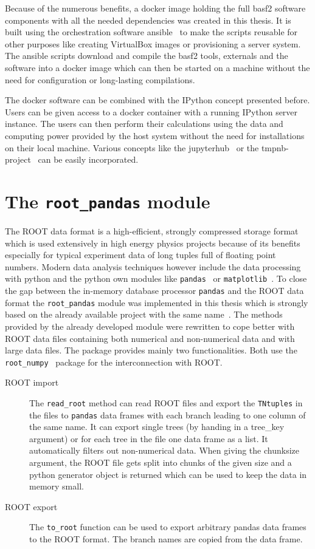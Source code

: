 Because of the numerous benefits, a docker image holding the full basf2 software components with all the needed dependencies was created in this thesis. It is built using the orchestration software ansible~\cite{ansible} to make the scripts reusable for other purposes like creating VirtualBox images or provisioning a server system. The ansible scripts download and compile the basf2 tools, externals and the software into a docker image which can then be started on a machine without the need for configuration or long-lasting compilations.

The docker software can be combined with the IPython concept presented before. Users can be given access to a docker container with a running IPython server instance. The users can then perform their calculations using the data and computing power provided by the host system without the need for installations on their local machine. Various concepts like the jupyterhub~\cite{jupyterhub} or the tmpnb-project~\cite{tmpnb} can be easily incorporated. 

\section{The \texttt{root\_pandas} module}

The ROOT data format is a high-efficient, strongly compressed storage format which is used extensively in high energy physics projects because of its benefits especially for typical experiment data of long tuples full of floating point numbers. Modern data analysis techniques however include the data processing with python and the python own modules like \texttt{pandas}~\cite{pandas} or \texttt{matplotlib}~\cite{matplotlib}. To close the gap between the in-memory database processor \texttt{pandas} and the ROOT data format the \texttt{root\_pandas} module was implemented in this thesis which is strongly based on the already available project with the same name~\cite{root-pandas}. The methods provided by the already developed module were rewritten to cope better with ROOT data files containing both numerical and non-numerical data and with large data files. The package provides mainly two functionalities. Both use the \texttt{root\_numpy}~\cite{root-numpy} package for the interconnection with ROOT.

\begin{description}
 \item[ROOT import] The \verb+read_root+ method can read ROOT files and export the \texttt{TNtuples} in the files to \texttt{pandas} data frames with each branch leading to one column of the same name. It can export single trees (by handing in a tree\_key argument) or for each tree in the file one data frame as a list. It automatically filters out non-numerical data. When giving the chunksize argument, the ROOT file gets split into chunks of the given size and a python generator object is returned which can be used to keep the data in memory small.
 \item[ROOT export] The \verb+to_root+ function can be used to export arbitrary pandas data frames to the ROOT format. The branch names are copied from the data frame.
\end{description}
